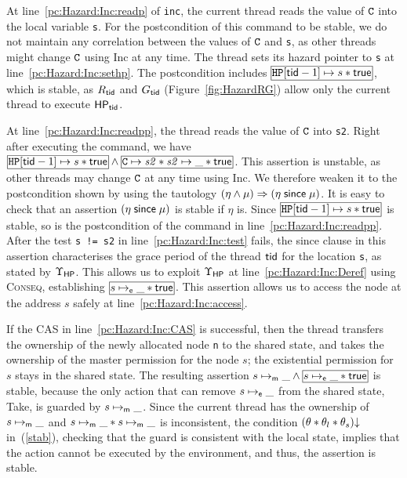At line~\ref{pc:Hazard:Inc:readp} of {\tt inc}, the current thread reads the
value of $\texttt{C}$ into the local variable \texttt{s}. For the postcondition of this
command to be stable, we do not maintain any correlation between the values of
$\texttt{C}$ and \texttt{s}, as other threads might change $\texttt{C}$ using \textsf{Inc} at
any time. The thread sets its hazard pointer to {\tt s} at
line~\ref{pc:Hazard:Inc:sethp}. The postcondition includes $\shareds{\HP[\ltid-1]
  \mapsto s * \true}$, which is stable, as $R_{{\sf tid}}$ and
$G_{{\sf tid}}$ (Figure~\ref{fig:HazardRG}) allow only the current thread to execute
${\sf HP}_{{\sf tid}}$.


At line~\ref{pc:Hazard:Inc:readpp}, the thread reads the value of $\texttt{C}$ into
{\tt s2}. Right after executing the command, we have $\shareds{\HP[\ltid-1]
  \mapsto s * \true} \wedge \shareds{\cc \mapsto {\it s2} * {\it s2} \mapsto \_
  * \true}$. This assertion is unstable, as other threads may change $\texttt{C}$ at
any time using {\sf Inc}. We therefore weaken it to the postcondition shown by
using the tautology $(\eta \wedge \mu) \Rightarrow (\eta \;\mathsf{since}\; \mu)$. It is easy to check
that an assertion $(\eta \;\mathsf{since}\; \mu)$ is stable if $\eta$ is. Since
$\shareds{\HP[\ltid-1] \mapsto s * \true}$ is stable, so is the postcondition of
the command in line~\ref{pc:Hazard:Inc:readpp}.  After the test \verb|s != s2|
in line~\ref{pc:Hazard:Inc:test} fails, the {\sf since} clause in this assertion
characterises the grace period of the thread ${\sf tid}$ for the location {\tt s}, as
stated by $\Upsilon_{\sf HP}$. This allows us to exploit
$\Upsilon_{\sf HP}$ at line~\ref{pc:Hazard:Inc:Deref} using \textsc{Conseq},
establishing $\shareds{s \mapsto_\se \_ * \true}$. 
This assertion allows us to access the node at the address $s$ safely at
line~\ref{pc:Hazard:Inc:access}.

If the CAS in line~\ref{pc:Hazard:Inc:CAS} is successful, then the thread
transfers the ownership of the newly allocated node {\tt n} to the shared state,
and takes the ownership of the master permission for the node $s$; the
existential permission for $s$ stays in the shared state. The resulting
assertion $s \mapsto_\sm \_ \wedge \shareds{s \mapsto_\se \_ * \true}$ is stable,
because the only action that can remove $s \mapsto_{\sf e} \_$ from the shared
state, {\sf Take}, is guarded by $s \mapsto_{\sf m} \_$. Since the current thread
has the ownership of $s \mapsto_{\sf m} \_$ and $s \mapsto_{\sf m} \_ * s \mapsto_{\sf m}
\_$ is inconsistent, the condition $(\theta*\theta_l*\theta_s)\mathpunct{\downarrow}$
in~(\ref{stab}), checking that the guard is consistent with the local state,
implies that the action cannot be executed by the environment, and thus, the
assertion is stable.

